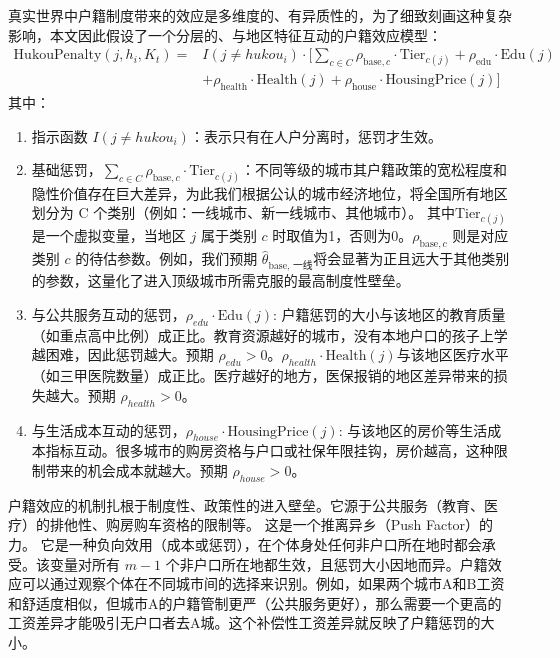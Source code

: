 \documentclass[master, final]{zufe-thesis}
\begin{document}
真实世界中户籍制度带来的效应是多维度的、有异质性的，为了细致刻画这种复杂影响，本文因此假设了一个分层的、与地区特征互动的户籍效应模型：
\begin{equation}
    \begin{split}
        \text{HukouPenalty}(j, h_i, K_t) ={}& I(j \neq hukou_i) \cdot \bigl[ \sum\limits_{c \in C} \rho_{\text{base}, c} \cdot \text{Tier}_{c(j)}+ \rho_{\text{edu}} \cdot \text{Edu}(j) \\
        & + \rho_{\text{health}} \cdot \text{Health}(j) + \rho_{\text{house}} \cdot \text{HousingPrice}(j) \bigr]
    \end{split}
\label{户籍惩罚函数}
\end{equation}
其中：
\begin{enumerate}
  \item 指示函数 $I(j \neq hukou_i)$：表示只有在人户分离时，惩罚才生效。

  \item 基础惩罚，$\sum\limits_{c \in C} \rho_{\text{base}, c} \cdot \text{Tier}_{c(j)}$：不同等级的城市其户籍政策的宽松程度和隐性价值存在巨大差异，为此我们根据公认的城市经济地位，将全国所有地区划分为 C 个类别（例如：一线城市、新一线城市、其他城市）。
  其中$\text{Tier}_{c(j)}$是一个虚拟变量，当地区 $j$ 属于类别 $c$ 时取值为1，否则为0。$\rho_{\text{base}, c}$ 则是对应类别 $c$ 的待估参数。例如，我们预期 $\hat{\theta}_{\text{base, 一线}}$将会显著为正且远大于其他类别的参数，这量化了进入顶级城市所需克服的最高制度性壁垒。

  \item 与公共服务互动的惩罚，$\rho_{edu} \cdot \text{Edu}(j)$: 户籍惩罚的大小与该地区的教育质量（如重点高中比例）成正比。教育资源越好的城市，没有本地户口的孩子上学越困难，因此惩罚越大。预期 $\rho_{edu} > 0$。$\rho_{health} \cdot \text{Health}(j)$与该地区医疗水平（如三甲医院数量）成正比。医疗越好的地方，医保报销的地区差异带来的损失越大。预期 $\rho_{health} > 0$。

  \item 与生活成本互动的惩罚，$\rho_{house} \cdot \text{HousingPrice}(j)$: 与该地区的房价等生活成本指标互动。很多城市的购房资格与户口或社保年限挂钩，房价越高，这种限制带来的机会成本就越大。预期 $\rho_{house} > 0$。
\end{enumerate}


户籍效应的机制扎根于制度性、政策性的进入壁垒。它源于公共服务（教育、医疗）的排他性、购房购车资格的限制等。
这是一个推离异乡（Push Factor）的力。
它是一种负向效用（成本或惩罚），在个体身处任何非户口所在地时都会承受。该变量对所有 $m-1$ 个非户口所在地都生效，且惩罚大小因地而异。户籍效应可以通过观察个体在不同城市间的选择来识别。例如，如果两个城市A和B工资和舒适度相似，但城市A的户籍管制更严（公共服务更好），那么需要一个更高的工资差异才能吸引无户口者去A城。这个补偿性工资差异就反映了户籍惩罚的大小。
\end{document}
